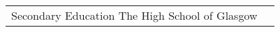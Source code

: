 \documentclass[10pt]{article} %
\begin{document}
\begin{paracol}{2}
\begin{supertabular}{rp{6.7cm}}

	{Secondary Education} %
	{} %
    {} %
    {The High School of Glasgow} %


\end{supertabular}



%
%

\end{paracol}
\end{document}
